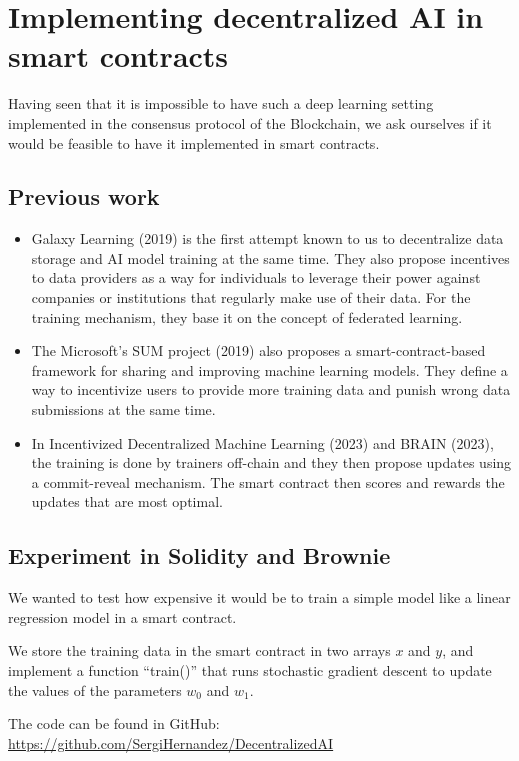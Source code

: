 \documentclass[conference]{IEEEtran}
\begin{document}
\section{Implementing decentralized AI in smart contracts}

Having seen that it is impossible to have such a deep learning setting implemented in the consensus protocol of the Blockchain, we ask ourselves if it would be feasible to have it implemented in smart contracts.

\subsection{Previous work}

\begin{itemize}
\item Galaxy Learning (2019)\cite{} is the first attempt known to us to decentralize data storage and AI model training at the same time. They also propose incentives to data providers as a way for individuals to leverage their power against companies or institutions that regularly make use of their data. For the training mechanism, they base it on the concept of federated learning.
\item The Microsoft's SUM project (2019)\cite{} also proposes a smart-contract-based framework for sharing and improving machine learning models. They define a way to incentivize users to provide more training data and punish wrong data submissions at the same time.
\item In Incentivized Decentralized Machine Learning (2023)\cite{} and BRAIN (2023)\cite{}, the training is done by trainers off-chain and they then propose updates using a commit-reveal mechanism. The smart contract then scores and rewards the updates that are most optimal.
\end{itemize}

\subsection{Experiment in Solidity and Brownie}
We wanted to test how expensive it would be to train a simple model like a linear regression model in a smart contract.

We store the training data in the smart contract in two arrays $x$ and $y$, and implement a function ``train()'' that runs stochastic gradient descent to update the values of the parameters $w_0$ and $w_1$.

The code can be found in GitHub: \url{https://github.com/SergiHernandez/DecentralizedAI}
\end{document}
